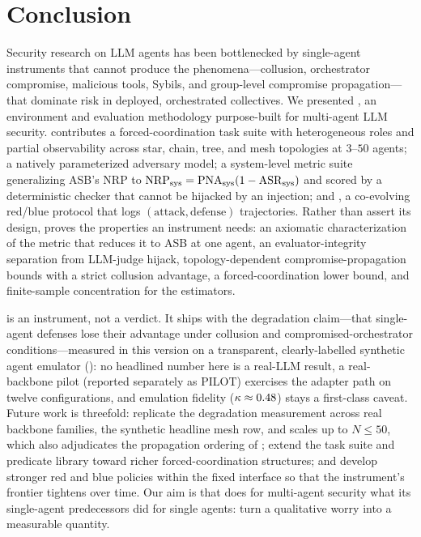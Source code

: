 \section{Conclusion}
\label{sec:conclusion}

Security research on LLM agents has been bottlenecked by single-agent instruments that
cannot produce the phenomena---collusion, orchestrator compromise, malicious tools, Sybils,
and group-level compromise propagation---that dominate risk in deployed, orchestrated
collectives. We presented , an environment and evaluation methodology
purpose-built for multi-agent LLM security.  contributes a forced-coordination
task suite with heterogeneous roles and partial observability across star, chain, tree, and
mesh topologies at $3$--$50$ agents; a natively parameterized adversary model; a
system-level metric suite generalizing ASB's $\mathrm{NRP}$ to $\mathrm{NRP}_{\mathrm{sys}}=\mathrm{PNA}_{\mathrm{sys}}(1-\mathrm{ASR}_{\mathrm{sys}})$ and
scored by a deterministic checker that cannot be hijacked by an injection; and \corb, a
co-evolving red/blue protocol that logs $(\text{attack},\text{defense})$ trajectories.
Rather than assert its design,  proves the properties an instrument needs: an
axiomatic characterization of the metric that reduces it to ASB at one agent, an
evaluator-integrity separation from LLM-judge hijack, topology-dependent
compromise-propagation bounds with a strict collusion advantage, a forced-coordination lower
bound, and finite-sample concentration for the estimators.

 is an instrument, not a verdict. It ships with the degradation claim---that
single-agent defenses lose their advantage under collusion and compromised-orchestrator
conditions---measured in this version on a transparent, clearly-labelled synthetic agent
emulator (): no headlined number here is a real-LLM result, a
real-backbone pilot (reported separately as PILOT) exercises the adapter path on twelve
configurations, and emulation fidelity ($\kappa\approx0.48$) stays a first-class caveat.
Future work is threefold: replicate the degradation measurement across real backbone
families, the synthetic headline mesh row, and scales up to
$N\le50$, which also adjudicates the propagation
ordering of ; extend the task suite and predicate library toward richer
forced-coordination structures; and develop stronger red and blue policies within the fixed
\corb{} interface so that the instrument's frontier tightens over time. Our aim is that
 does for multi-agent security what its single-agent predecessors did for single
agents: turn a qualitative worry into a measurable quantity.
